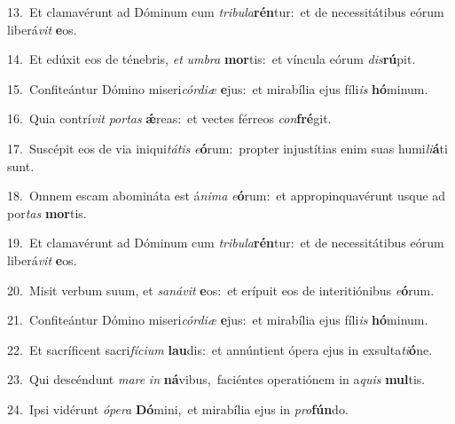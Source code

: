 {\numbfont\textcolor{\numbcolor}{13.}}~Et clamavérunt ad Dóminum cum \textit{tri}\-\textit{bu}\textit{la}\textbf{rén}tur:~\star et de necessitátibus eórum liberá\textit{vit} \textbf{e}\-os.\par
{\numbfont\textcolor{\numbcolor}{14.}}~Et edúxit eos de ténebris, \textit{et} \textit{um}\-\textit{bra} \textbf{mor}\-tis:~\star et víncula eórum \textit{dis}\-\textbf{rú}pit.\par
{\numbfont\textcolor{\numbcolor}{15.}}~Confiteántur Dómino miseri\-\textit{cór}\-\textit{di}\textit{æ} \textbf{e}\-jus:~\star et mirabília ejus fíli\textit{is} \textbf{hó}\-minum.\par
{\numbfont\textcolor{\numbcolor}{16.}}~Quia contrí\textit{vit} \textit{por}\-\textit{tas} \textbf{ǽ}\-reas:~\star et vectes férreos \textit{con}\-\textbf{fré}git.\par
{\numbfont\textcolor{\numbcolor}{17.}}~Suscépit eos de via iniqui\-\textit{tá}\-\textit{tis} \textit{e}\-\textbf{ó}rum:~\star propter injustítias enim suas humi\-\textit{li}\-\textbf{á}ti sunt.\par
{\numbfont\textcolor{\numbcolor}{18.}}~Omnem escam abomináta est á\-\textit{ni}\-\textit{ma} \textit{e}\-\textbf{ó}rum:~\star et appropinquavérunt usque ad por\textit{tas} \textbf{mor}\-tis.\par
{\numbfont\textcolor{\numbcolor}{19.}}~Et clamavérunt ad Dóminum cum \textit{tri}\-\textit{bu}\textit{la}\textbf{rén}tur:~\star et de necessitátibus eórum liberá\textit{vit} \textbf{e}\-os.\par
{\numbfont\textcolor{\numbcolor}{20.}}~Misit verbum suum, et \textit{sa}\-\textit{ná}\textit{vit} \textbf{e}\-os:~\star et erípuit eos de interitiónibus \textit{e}\-\textbf{ó}rum.\par
{\numbfont\textcolor{\numbcolor}{21.}}~Confiteántur Dómino miseri\-\textit{cór}\-\textit{di}\textit{æ} \textbf{e}\-jus:~\star et mirabília ejus fíli\textit{is} \textbf{hó}\-minum.\par
{\numbfont\textcolor{\numbcolor}{22.}}~Et sacríficent sacri\-\textit{fí}\-\textit{ci}\textit{um} \textbf{lau}\-dis:~\star et annúntient ópera ejus in exsulta\-\textit{ti}\-\textbf{ó}ne.\par
{\numbfont\textcolor{\numbcolor}{23.}}~Qui descéndunt \textit{ma}\-\textit{re} \textit{in} \textbf{ná}\-vibus,~\star faciéntes operatiónem in a\textit{quis} \textbf{mul}\-tis.\par
{\numbfont\textcolor{\numbcolor}{24.}}~Ipsi vidérunt \textit{ó}\-\textit{pe}\textit{ra} \textbf{Dó}\-mini,~\star et mirabília ejus in \textit{pro}\-\textbf{fún}do.\par
